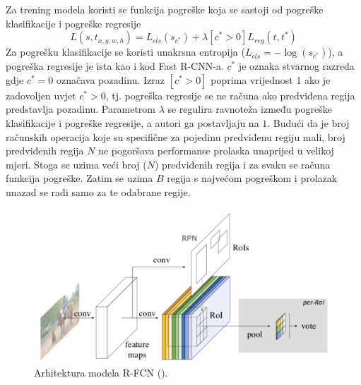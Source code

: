 Za trening modela koristi se funkcija pogreške koja se sastoji od pogreške klasifikacije i pogreške regresije
\[
	L(s, t_{x, y, w, h}) = L_{cls}(s_{c^*}) + \lambda [c^* > 0]L_{reg}(t, t^*)
\]
Za pogrešku klasifikacije se koristi unakrsna entropija ($L_{cls} = - \log(s_{c^*})$), a pogreška regresije je ista kao i kod Fast R-CNN-a. $c^*$ je oznaka stvarnog razreda gdje $c^* = 0$ označava pozadinu. Izraz $[c^* > 0]$ poprima vrijednost 1 ako je zadovoljen uvjet $c^* > 0$, tj. pogreška regresije se ne računa ako predviđena regija predstavlja pozadinu. Parametrom $\lambda$ se regulira ravnoteža između pogreške klasifikacije i pogreške regresije, a autori ga postavljaju na $1$.
Budući da je broj računskih operacija koje su specifične za pojedinu predviđenu regiju mali, broj predviđenih regija $N$ ne pogoršava performanse prolaska unaprijed u velikoj mjeri. Stoga se uzima veći broj ($N$) predviđenih regija i za svaku se računa funkcija pogreške. Zatim se uzima $B$ regija s najvećom pogreškom i prolazak unazad se radi samo za te odabrane regije.

 \begin{figure}
	\centering
	\includegraphics[scale=0.9]{img/rfcn_arhitektura.png}
	\caption{Arhitektura modela R-FCN (\cite{DBLP:journals/corr/DaiLHS16}).}
	\label{rfcn_arhitektura}
\end{figure}

